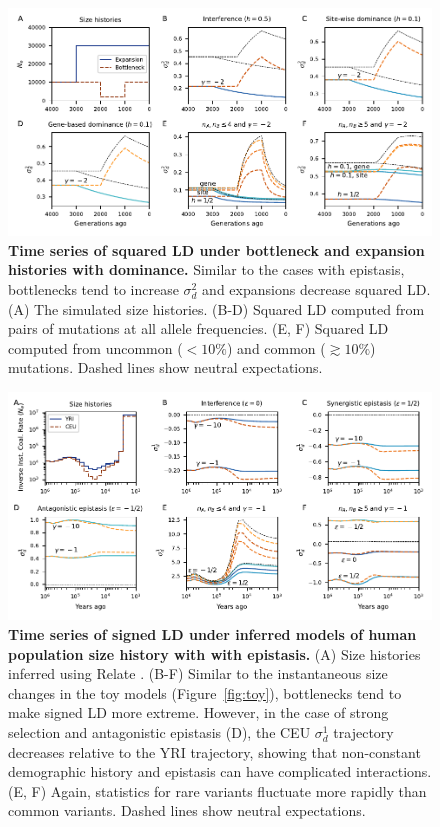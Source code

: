 \documentclass[]{article}
\begin{document}
\begin{figure}[ht!]
    \centering
    \includegraphics{../figures/demog_bottle_expand.dominance.sd2}
    \caption{
        \textbf{Time series of squared LD under bottleneck 
        and expansion histories with dominance.}
        Similar to the cases with epistasis, bottlenecks tend to increase
        \(\sigma_d^2\) and expansions decrease squared LD.
        (A) The simulated size histories.
        (B-D) Squared LD computed from pairs of mutations at all allele frequencies.
        (E, F) Squared LD computed from uncommon ($<10\%$) and common ($\gtrsim 10\%$)
        mutations.
        Dashed lines show neutral expectations.
    }
    \label{fig:toy_dom_sd2}
\end{figure}

\begin{figure}[ht!]
    \centering
    \includegraphics{../figures/demog_YRI_CEU}
    \caption{
        \textbf{Time series of signed LD under inferred models of human population
        size history with with epistasis.}
        (A) Size histories inferred using Relate \citep{Speidel2019-nj}.
        (B-F)
        Similar to the instantaneous size changes in the toy models
        (Figure~\ref{fig:toy}), bottlenecks tend to make signed LD more extreme.
        However, in the case of strong selection and antagonistic epistasis (D),
        the CEU \(\sigma_d^1\) trajectory decreases relative to the YRI
        trajectory, showing that non-constant demographic history and epistasis can
        have complicated interactions.
        (E, F) Again, statistics for rare variants fluctuate more rapidly
        than common variants.
        Dashed lines show neutral expectations.
    }
    \label{fig:relate}
\end{figure}
\end{document}
